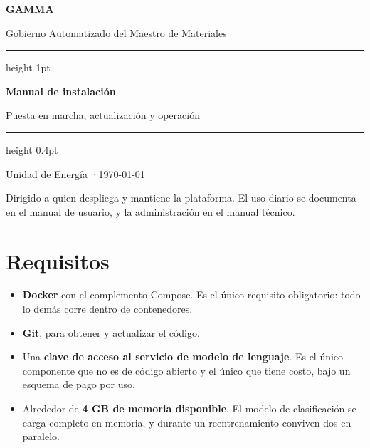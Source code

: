 %




\begin{titlepage}
\thispagestyle{empty}
\vspace*{5.5cm}
{\fontsize{46}{50}\selectfont\bfseries\color{fg} GAMMA\par}
\vspace{0.5em}
{\large\color{muted} Gobierno Automatizado del Maestro de Materiales\par}

\vspace{2.6cm}
{\color{line}\hrule height 1pt}
\vspace{1.2em}

{\huge\bfseries\color{fg} Manual de instalación\par}
\vspace{0.5em}
{\large\color{muted} Puesta en marcha, actualización y operación\par}

\vfill
{\color{line}\hrule height 0.4pt}
\vspace{1em}
{\footnotesize\color{muted}
Unidad de Energía \quad·\quad \today\par
\vspace{0.4em}
Dirigido a quien despliega y mantiene la plataforma.
El uso diario se documenta en el manual de usuario, y la administración en el
manual técnico.\par}
\vspace{1cm}
\end{titlepage}

\tableofcontents
\newpage

\section{Requisitos}

\begin{itemize}[leftmargin=*, itemsep=3pt]
  \item \textbf{Docker} con el complemento Compose. Es el único requisito
        obligatorio: todo lo demás corre dentro de contenedores.
  \item \textbf{Git}, para obtener y actualizar el código.
  \item Una \textbf{clave de acceso al servicio de modelo de lenguaje}. Es el
        único componente que no es de código abierto y el único que tiene costo,
        bajo un esquema de pago por uso.
  \item Alrededor de \textbf{4 GB de memoria disponible}. El modelo de
        clasificación se carga completo en memoria, y durante un reentrenamiento
        conviven dos en paralelo.
\end{itemize}

